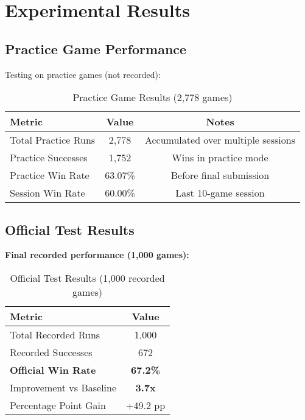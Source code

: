 \documentclass[12pt,a4paper]{article}
\begin{document}
\section{Experimental Results}

\subsection{Practice Game Performance}

Testing on practice games (not recorded):

\begin{table}[H]
\centering
\caption{Practice Game Results (2,778 games)}
\begin{tabular}{@{}lcc@{}}
\toprule
\textbf{Metric} & \textbf{Value} & \textbf{Notes} \\
\midrule
Total Practice Runs & 2,778 & Accumulated over multiple sessions \\
Practice Successes & 1,752 & Wins in practice mode \\
Practice Win Rate & 63.07\% & Before final submission \\
Session Win Rate & 60.00\% & Last 10-game session \\
\bottomrule
\end{tabular}
\end{table}

\subsection{Official Test Results}

\textbf{Final recorded performance (1,000 games):}

\begin{center}
\end{center}

\begin{table}[H]
\centering
\caption{Official Test Results (1,000 recorded games)}
\begin{tabular}{@{}lc@{}}
\toprule
\textbf{Metric} & \textbf{Value} \\
\midrule
Total Recorded Runs & 1,000 \\
Recorded Successes & 672 \\
\textbf{Official Win Rate} & \textbf{67.2\%} \\
Improvement vs Baseline & \textbf{3.7x} \\
Percentage Point Gain & +49.2 pp \\
\bottomrule
\end{tabular}
\end{table}
\end{document}
